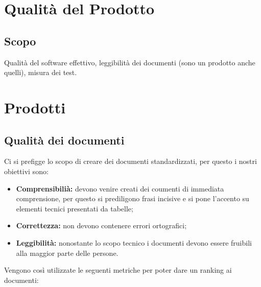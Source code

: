 \section{Qualità del Prodotto}
\subsection{Scopo}
Qualità del software effettivo, leggibilità dei documenti (sono un prodotto anche quelli), misura dei test.

\section{Prodotti}
\subsection{Qualità dei documenti}
Ci si prefigge lo scopo di creare dei documenti standardizzati, per questo i nostri obiettivi sono:
\begin{itemize}
	\item{\textbf{Comprensibilià:} devono venire creati dei coumenti di immediata comprensione, per questo si prediligono frasi incisive e si pone l'accento su elementi tecnici presentati da tabelle;}
	\item{\textbf{Correttezza:} non devono contenere errori ortografici;}
	\item{\textbf{Leggibilità:} nonostante lo scopo tecnico i documenti devono essere fruibili alla maggior parte delle persone.}
\end{itemize}
Vengono così utilizzate le seguenti metriche per poter dare un ranking ai documenti:
